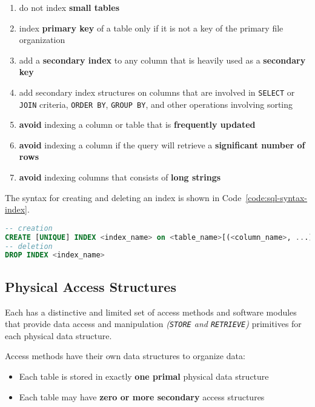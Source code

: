 \documentclass[english]{article}
\begin{document}
\begin{enumerate}
  \item do not index \textbf{small tables}
  \item index \textbf{primary key }of a table only if it is not a key of the primary file organization
  \item add a \textbf{secondary index} to any column that is heavily used as a \textbf{secondary key}
  \item add secondary index structures on columns that are involved in \texttt{SELECT} or \texttt{JOIN} criteria, \texttt{ORDER BY}, \texttt{GROUP BY}, and other operations involving sorting
  \item \textbf{avoid} indexing a column or table that is \textbf{frequently updated}
  \item \textbf{avoid} indexing a column if the query will retrieve a \textbf{significant number of rows}
  \item \textbf{avoid} indexing columns that consists of \textbf{long strings}
\end{enumerate}

The \sql syntax for creating and deleting an index is shown in Code~\ref{code:sql-syntax-index}.

\begin{lstlisting}[language=SQL, caption={\sql syntax for creating and deleting an index}, label={code:sql-syntax-index}]
-- creation
CREATE [UNIQUE] INDEX <index_name> on <table_name>[(<column_name>, ...)]
-- deletion
DROP INDEX <index_name>
\end{lstlisting}

\subsection{Physical Access Structures}

Each \dbms has a distinctive and limited set of access methods and software modules that provide data access and manipulation \textit{(\texttt{STORE} and \texttt{RETRIEVE})} primitives for each physical data structure.

Access methods have their own data structures to organize data:

\begin{itemize}
  \item Each table is stored in exactly \textbf{one primal} physical data structure
  \item Each table may have \textbf{zero or more secondary} access structures
\end{itemize}
\end{document}
